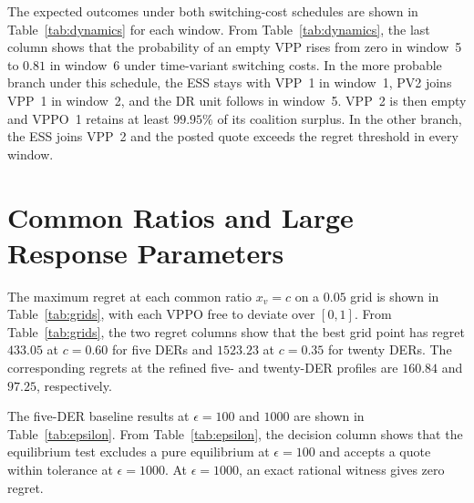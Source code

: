 \documentclass[10pt]{article}
\begin{document}
The expected outcomes under both switching-cost schedules are shown in Table~\ref{tab:dynamics} for each window. From Table~\ref{tab:dynamics}, the last column shows that the probability of an empty VPP rises from zero in window~5 to $0.81$ in window~6 under time-variant switching costs. In the more probable branch under this schedule, the ESS stays with VPP~1 in window~1, PV2 joins VPP~1 in window~2, and the DR unit follows in window~5. VPP~2 is then empty and VPPO~1 retains at least $99.95\%$ of its coalition surplus. In the other branch, the ESS joins VPP~2 and the posted quote exceeds the regret threshold in every window.

\begin{table}[h]
\centering
\caption{Five-DER outcomes per window. $P_\eta=\Pr(\rho\le\eta-\delta)$ is the probability of meeting the regret threshold, and $\mathbb E\rho$ is expected maximum regret. Regret, cash and DER gain are in \CurrencySymbol{} per contract period. Cash is the expected VPPO cash flow. DER gain is expected realized gain above stand-alone profit net of time-variant or flat switching costs. The Switches column gives the expected number of DERs that change VPPs, and $P_{\text{empty}}$ is the probability of an empty VPP.}
\label{tab:dynamics}
\small

\end{table}

\section{Common Ratios and Large Response Parameters}\label{sec:grids}
The maximum regret at each common ratio $x_v=c$ on a $0.05$ grid is shown in Table~\ref{tab:grids}, with each VPPO free to deviate over $[0,1]$. From Table~\ref{tab:grids}, the two regret columns show that the best grid point has regret $433.05$ at $c=0.60$ for five DERs and $1523.23$ at $c=0.35$ for twenty DERs. The corresponding regrets at the refined five- and twenty-DER profiles are $160.84$ and $97.25$, respectively.

The five-DER baseline results at $\epsilon=100$ and $1000$ are shown in Table~\ref{tab:epsilon}. From Table~\ref{tab:epsilon}, the decision column shows that the equilibrium test excludes a pure equilibrium at $\epsilon=100$ and accepts a quote within tolerance at $\epsilon=1000$. At $\epsilon=1000$, an exact rational witness gives zero regret.

\begin{table}[h]
\centering
\caption{Maximum regret (\CurrencySymbol{} per contract period) at common ratios}
\label{tab:grids}
\small

\end{table}

\begin{table}[h]
\centering
\caption{Algorithm~1 on the five-DER baseline at large response parameters. The bracket bounds minimum maximum regret in \CurrencySymbol{} per contract period. The decisions and affiliation probabilities $y_{d1}$ for VPP~1 use the unrounded quotes.}
\label{tab:epsilon}
\small

\end{table}
\end{document}

